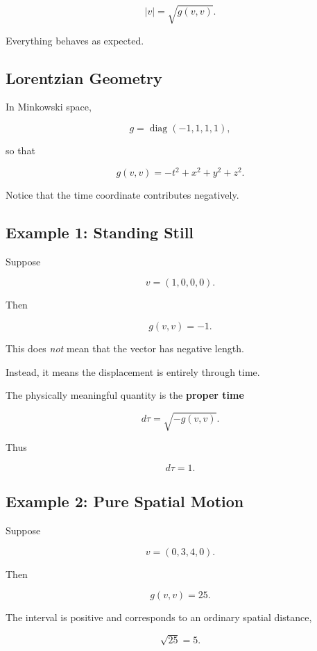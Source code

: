 \documentclass[12pt,a4paper]{article}
\theoremstyle{notespace}
\begin{document}
\[
|v|
=
\sqrt{g(v,v)}.
\]

Everything behaves as expected.


\subsection{Lorentzian Geometry}

In Minkowski space,

\[
g=
\operatorname{diag}(-1,1,1,1),
\]

so that

\[
g(v,v)
=
-t^2+x^2+y^2+z^2.
\]

Notice that the time coordinate contributes negatively.


\subsection{Example 1: Standing Still}

Suppose

\[
v=(1,0,0,0).
\]

Then

\[
g(v,v)
=
-1.
\]

This does \emph{not} mean that the vector has negative length.

Instead, it means the displacement is entirely through time.

The physically meaningful quantity is the
\textbf{proper time}

\[
d\tau
=
\sqrt{-g(v,v)}.
\]

Thus

\[
d\tau
=
1.
\]


\subsection{Example 2: Pure Spatial Motion}

Suppose

\[
v=(0,3,4,0).
\]

Then

\[
g(v,v)
=
25.
\]

The interval is positive and corresponds to an ordinary spatial distance,

\[
\sqrt{25}=5.
\]
\end{document}
